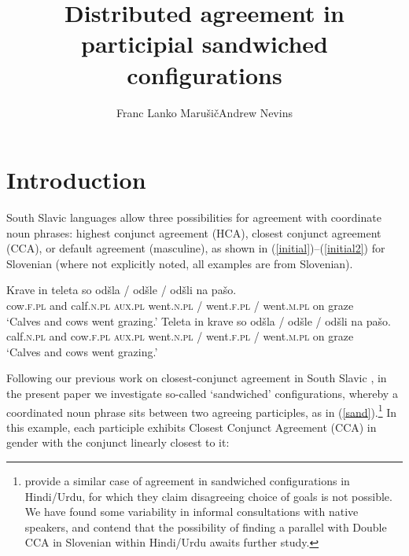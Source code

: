 \documentclass[output=paper
,modfonts
,nonflat]{langsci/langscibook}
\title{Distributed agreement in participial sandwiched configurations}
\author{Franc Lanko Marušič\affiliation{University of Nova Gorica}\lastand Andrew Nevins\affiliation{University College London}}
\begin{document}
\maketitle
\section{Introduction} 

South Slavic languages allow three possibilities for agreement with coordinate noun phrases: highest conjunct agreement (HCA), closest conjunct agreement (CCA), or default agreement (masculine), as shown in (\ref{initial})--(\ref{initial2}) for Slovenian (where not explicitly noted, all examples are from Slovenian).

\begin{exe}
\ex \label{initial}
\gll Krave in teleta so odšla / odšle / odšli na pašo.\\
cow.\textsc{f.pl} and calf.\textsc{n.pl} \textsc{aux.pl} went.\textsc{n.pl} / went.\textsc{f.pl} / went.\textsc{m.pl} on graze\\
\glt `Calves and cows went grazing.'
\ex \label{initial2}
\gll Teleta in krave so odšla / odšle / odšli na pašo.\\
calf.\textsc{n.pl} and cow.\textsc{f.pl} \textsc{aux.pl} went.\textsc{n.pl} / went.\textsc{f.pl} / went.\textsc{m.pl} on graze\\
\glt `Calves and cows went grazing.'
\end{exe}
Following our previous work on closest-conjunct agreement in South Slavic \citep{marusicnevinssaksida:07,marusicnevinsbadecker:15,willergold:16}, in the present paper we investigate so-called `sandwiched' configurations, whereby a coordinated noun phrase sits between two agreeing participles, as in (\ref{sand}).\footnote{\citet{bhattwalkow:13} provide a similar case of agreement in sandwiched configurations in Hindi/Urdu, for which they claim disagreeing choice of goals is not possible. We have found some variability in informal consultations with native speakers, and contend that the possibility of finding a parallel with Double CCA in Slovenian within Hindi/Urdu awaits further study.} In this example, each participle exhibits Closest Conjunct Agreement (CCA) in gender with the conjunct linearly closest to it:
\end{document}
